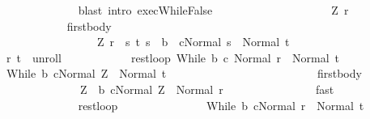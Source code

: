 \begin{isabellebody}
\ \ \ \ \ \ \ \ \ \ \ \ \isamarkupfalse%
\ {\isacharparenleft}blast\ intro{\isacharcolon}\ exec{\isachardot}WhileFalse{\isacharparenright}\isanewline
\ \ \ \ \ \ \ \ \isamarkupfalse%
\isanewline
\ \ \ \ \ \ \ \ \ \ \isamarkupfalse%
\ Z\ r\isanewline
\ \ \ \ \ \ \ \ \ \ \isamarkupfalse%
\ first{\isacharunderscore}body{\isacharcolon}\ \isanewline
\ \ \ \ \ \ \ \ \ \ \ \ \ \ \ \ \ {\isachardoublequoteopen}{\isacharparenleft}Z{\isacharcomma}\ r{\isacharparenright}\ {\isasymin}\ {\isacharbraceleft}{\isacharparenleft}s{\isacharcomma}\ t{\isacharparenright}{\isachardot}\ s\ {\isasymin}\ b\ {\isasymand}\ {\isasymGamma}{\isasymturnstile}{\isasymlangle}c{\isacharcomma}Normal\ s{\isasymrangle}\ {\isasymRightarrow}\ Normal\ t{\isacharbraceright}{\isachardoublequoteclose}\isanewline
\ \ \ \ \ \ \ \ \ \ \isamarkupfalse%
\ {\isachardoublequoteopen}{\isacharparenleft}r{\isacharcomma}\ t{\isacharparenright}\ {\isasymin}\ {\isacharquery}unroll{\isachardoublequoteclose}\isanewline
\ \ \ \ \ \ \ \ \ \ \isamarkupfalse%
\ rest{\isacharunderscore}loop{\isacharcolon}\ {\isachardoublequoteopen}{\isasymGamma}{\isasymturnstile}{\isasymlangle}While\ b\ c{\isacharcomma}\ Normal\ r{\isasymrangle}\ {\isasymRightarrow}\ Normal\ t{\isachardoublequoteclose}\isanewline
\ \ \ \ \ \ \ \ \ \ \isamarkupfalse%
\ {\isachardoublequoteopen}{\isasymGamma}{\isasymturnstile}{\isasymlangle}While\ b\ c{\isacharcomma}Normal\ Z{\isasymrangle}\ {\isasymRightarrow}\ Normal\ t{\isachardoublequoteclose}\isanewline
\ \ \ \ \ \ \ \ \ \ \isamarkupfalse%
\ {\isacharminus}\isanewline
\ \ \ \ \ \ \ \ \ \ \ \ \isamarkupfalse%
\ first{\isacharunderscore}body\ \isamarkupfalse%
\isanewline
\ \ \ \ \ \ \ \ \ \ \ \ \ \ {\isachardoublequoteopen}Z\ {\isasymin}\ b{\isachardoublequoteclose}\ {\isachardoublequoteopen}{\isasymGamma}{\isasymturnstile}{\isasymlangle}c{\isacharcomma}Normal\ Z{\isasymrangle}\ {\isasymRightarrow}\ Normal\ r{\isachardoublequoteclose}\isanewline
\ \ \ \ \ \ \ \ \ \ \ \ \ \ \isamarkupfalse%
\ fast\isanewline
\ \ \ \ \ \ \ \ \ \ \ \ \isamarkupfalse%
\isanewline
\ \ \ \ \ \ \ \ \ \ \ \ \isamarkupfalse%
\ rest{\isacharunderscore}loop\ \isamarkupfalse%
\isanewline
\ \ \ \ \ \ \ \ \ \ \ \ \ \ {\isachardoublequoteopen}{\isasymGamma}{\isasymturnstile}{\isasymlangle}While\ b\ c{\isacharcomma}Normal\ r{\isasymrangle}\ {\isasymRightarrow}\ Normal\ t{\isachardoublequoteclose}\isanewline

\end{isabellebody}
